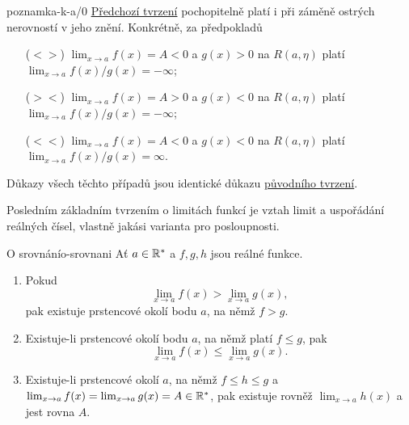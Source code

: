 \begin{remark}{}{poznamka-k-a/0}
 \hyperref[prop:limita-a/0]{Předchozí tvrzení} pochopitelně platí i při záměně
 ostrých nerovností v jeho znění. Konkrétně, za předpokladů
 \begin{itemize}
  \item[($< >$)] $\lim_{x \to a} f(x) = A < 0$ a $g(x) > 0$ na $R(a,\eta)$ platí
   $\lim_{x \to a} f(x) / g(x) = -\infty$;
  \item[($> <$)] $\lim_{x \to a} f(x) = A > 0$ a $g(x) < 0$ na $R(a,\eta)$ platí
   $\lim_{x \to a} f(x) / g(x) = -\infty$;
  \item[($< <$)] $\lim_{x \to a} f(x) = A < 0$ a $g(x) < 0$ na $R(a,\eta)$ platí
   $\lim_{x \to a} f(x) / g(x) = \infty$.
 \end{itemize}
 Důkazy všech těchto případů jsou identické důkazu
 \hyperref[prop:limita-a/0]{původního tvrzení}.
\end{remark}

Posledním základním tvrzením o limitách funkcí je vztah limit a uspořádání
reálných čísel, vlastně jakási varianta 
pro posloupnosti.

\begin{theorem}{O srovnání}{o-srovnani}
 Ať $a \in \mathbb{R}^{*}$ a $f,g,h$ jsou reálné funkce.
 \begin{enumerate}[label=(\alph*)]
  \item Pokud
   \[
    \lim_{x \to a} f(x) > \lim_{x \to a} g(x),
   \]
   pak existuje prstencové okolí bodu $a$, na němž $f > g$.
  \item Existuje-li prstencové okolí bodu $a$, na němž platí $f \leq g$, pak
   \[
    \lim_{x \to a} f(x) \leq \lim_{x \to a} g(x).
   \]
  \item Existuje-li prstencové okolí $a$, na němž $f \leq h \leq g$ a $\lim_{x
   \to a} f(x) = \lim_{x \to a} g(x) = A \in \mathbb{R}^{*}$, pak existuje rovněž
   $\lim_{x \to a} h(x)$ a jest rovna $A$.
 \end{enumerate}
\end{theorem}

